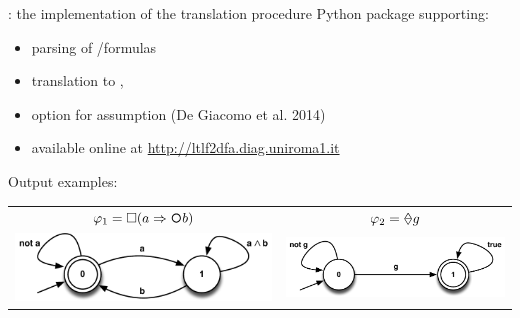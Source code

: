 \documentclass[10pt]{beamer}
\begin{document}
\begin{frame}{\LTLfToDFA: the implementation of the translation procedure}
Python package supporting:
	\begin{itemize}
		\item parsing of \LTLf/\PLTL formulas 
		\item translation to \FOL, \DFA
		\item option for \declare assumption (De Giacomo et al. 2014)
		\item available online at \href{http://ltlf2dfa.diag.uniroma1.it}{http://ltlf2dfa.diag.uniroma1.it}
	\end{itemize}
	
	
	Output examples:
\begin{table}
	\centering
\begin{tabular}{c c} 
	$\varphi_1 = \Box(a \Rightarrow \Next b)$ & $\varphi_2 = \Once g$\\
    \includegraphics[width=.5\textwidth]{../images/future-slide} & \includegraphics[width=.5\textwidth]{../images/future-pres}\\
\end{tabular}\\
\end{table}
\end{frame}
\end{document}
